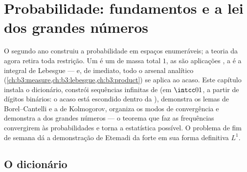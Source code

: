 \chapter{Probabilidade: fundamentos e a lei dos grandes
números}\label{ch:b3:probability}

O segundo ano construiu a probabilidade em espaços enumeráveis; a teoria
da  agora retira toda restrição. Um  é um
 de massa total $1$, as  são
aplicações , a  é a integral de Lebesgue --- e, de
imediato, todo o arsenal analítico (\cref{ch:b3:measure,ch:b3:lebesgue,ch:b3:product}) se aplica ao acaso.
Este capítulo instala o dicionário, constrói sequências infinitas de
  (em $\intcc01$, a partir de dígitos
binários: o acaso está escondido dentro da ),
demonstra os lemas de Borel--Cantelli e a  de Kolmogorov,
organiza os modos de convergência e demonstra a  dos grandes números
--- o teorema que faz as frequências convergirem às probabilidades e
torna a estatística possível. O problema de fim de semana dá a
demonstração de Etemadi da  forte em sua forma definitiva $L^1$.

\section{O dicionário}

